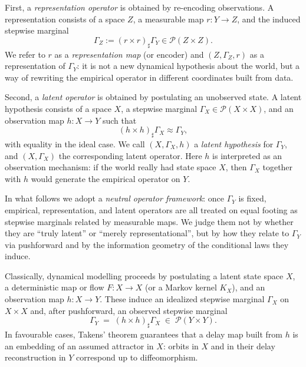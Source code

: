 \documentclass[11pt]{article}
\newcommand{\1}{\mathbf{1}}
\begin{document}
First, a \emph{representation operator} is obtained by re-encoding observations. A representation consists of a space $Z$, a measurable map $r : Y \to Z$, and the induced stepwise marginal
\[
  \Gamma_Z := (r\times r)_{\sharp}\Gamma_Y \in \mathcal P(Z\times Z).
\]
We refer to $r$ as a \emph{representation map} (or encoder) and $(Z,\Gamma_Z,r)$ as a representation of $\Gamma_Y$: it is not a new dynamical hypothesis about the world, but a way of rewriting the empirical operator in different coordinates built from data.

Second, a \emph{latent operator} is obtained by postulating an unobserved state. A latent hypothesis consists of a space $X$, a stepwise marginal $\Gamma_X \in \mathcal P(X\times X)$, and an observation map $h : X \to Y$ such that
\[
  (h\times h)_{\sharp}\Gamma_X \approx \Gamma_Y,
\]
with equality in the ideal case. We call $(X,\Gamma_X,h)$ a \emph{latent hypothesis} for $\Gamma_Y$, and $(X,\Gamma_X)$ the corresponding latent operator. Here $h$ is interpreted as an observation mechanism: if the world really had state space $X$, then $\Gamma_X$ together with $h$ would generate the empirical operator on $Y$.

In what follows we adopt a \emph{neutral operator framework}: once $\Gamma_Y$ is fixed, empirical, representation, and latent operators are all treated on equal footing as stepwise marginals related by measurable maps. We judge them not by whether they are ``truly latent'' or ``merely representational'', but by how they relate to $\Gamma_Y$ via pushforward and by the information geometry of the conditional laws they induce.

Classically, dynamical modelling proceeds by postulating a latent state space $X$, a deterministic map or flow $F:X\to X$ (or a Markov kernel $K_X$), and an observation map $h:X\to Y$. These induce an idealized stepwise marginal $\Gamma_X$ on $X\times X$ and, after pushforward, an observed stepwise marginal
\[
  \Gamma_Y \;=\; (h\times h)_{\sharp}\Gamma_X \;\in\; \mathcal{P}(Y\times Y).
\]
In favourable cases, Takens' theorem guarantees that a delay map built from $h$ is an embedding of an assumed attractor in $X$: orbits in $X$ and in their delay reconstruction in $Y$ correspond up to diffeomorphism.
\end{document}
